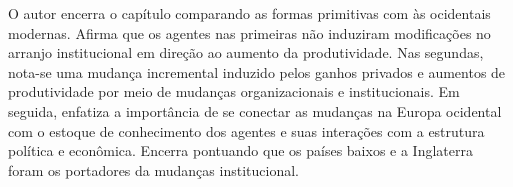 O autor encerra o capítulo comparando as formas primitivas com às ocidentais modernas. Afirma que os agentes nas primeiras não induziram modificações no arranjo institucional em direção ao aumento da produtividade. Nas segundas, nota-se uma mudança incremental induzido pelos ganhos privados e aumentos de produtividade por meio de mudanças organizacionais e institucionais. Em seguida, enfatiza a importância de se conectar as mudanças na Europa ocidental com o estoque de conhecimento dos agentes e suas interações com a estrutura política e econômica. Encerra pontuando que os países baixos e a Inglaterra foram os portadores da mudanças institucional.